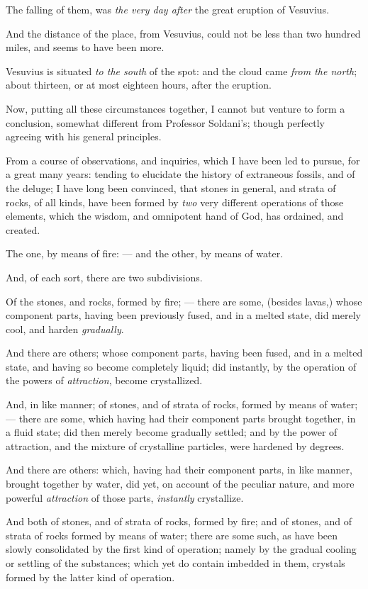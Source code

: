 \documentclass[a4paper, 12pt, oneside]{article}
\begin{document}
The falling of them, was \emph{the very day after} the great eruption of Vesuvius.

And the distance of the place, from Vesuvius, could not be less than two hundred miles, and seems to have been more.

Vesuvius is situated \emph{to the south} of the spot: and the cloud came \emph{from the north}; about thirteen, or at most eighteen hours, after the eruption.

Now, putting all these circumstances together, I cannot but venture to form a conclusion, somewhat different from Professor Soldani's; though perfectly agreeing with his general principles.

From a course of observations, and inquiries, which I have been led to pursue, for a great many years: tending to elucidate the history of extraneous fossils, and of the deluge; I have long been convinced, that stones in general, and strata of rocks, of all kinds, have been formed by \emph{two} very different operations of those elements, which the wisdom, and omnipotent hand of God, has ordained, and created.

The one, by means of fire: --- and the other, by means of water.

And, of each sort, there are two subdivisions.

Of the stones, and rocks, formed by fire; --- there are some, (besides lavas,) whose component parts, having been previously fused, and in a melted state, did merely cool, and harden \emph{gradually}.

And there are others; whose component parts, having been fused, and in a melted state, and having so become completely liquid; did instantly, by the operation of the powers of \emph{attraction}, become crystallized.

And, in like manner; of stones, and of strata of rocks, formed by means of water; --- there are some, which having had their component parts brought together, in a fluid state; did then merely become gradually settled; and by the power of attraction, and the mixture of crystalline particles, were hardened by degrees.

And there are others: which, having had their component parts, in like manner, brought together by water, did yet, on account of the peculiar nature, and more powerful \emph{attraction} of those parts, \emph{instantly} crystallize.

And both of stones, and of strata of rocks, formed by fire; and of stones, and of strata of rocks formed by means of water; there are some such, as have been slowly consolidated by the first kind of operation; namely by the gradual cooling or settling of the substances; which yet do contain imbedded in them, crystals formed by the latter kind of operation.
\end{document}
